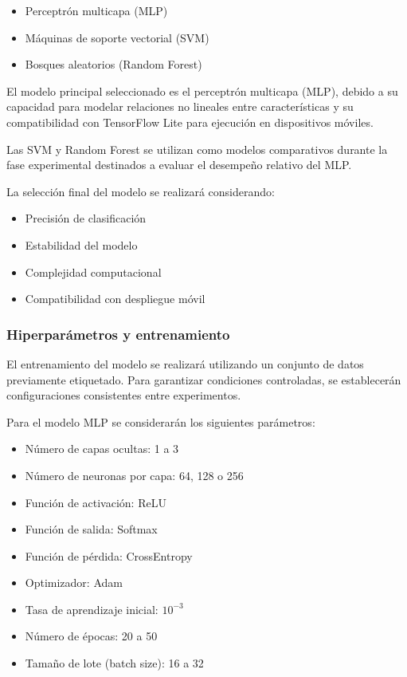 	\begin{itemize}
		\item Perceptrón multicapa (MLP)
		\item Máquinas de soporte vectorial (SVM)
		\item Bosques aleatorios (Random Forest)
	\end{itemize}
	
	El modelo principal seleccionado es el perceptrón multicapa (MLP), debido a su capacidad para modelar relaciones no lineales entre características y su compatibilidad con TensorFlow Lite para ejecución en dispositivos móviles.
	
	Las SVM y Random Forest se utilizan como modelos comparativos durante 
	la fase experimental destinados a evaluar el desempeño relativo del MLP.
	
	La selección final del modelo se realizará considerando:
	\begin{itemize}
		\item Precisión de clasificación
		\item Estabilidad del modelo
		\item Complejidad computacional
		\item Compatibilidad con despliegue móvil
	\end{itemize}
	
	\subsubsection{Hiperparámetros y entrenamiento}
	
	El entrenamiento del modelo se realizará utilizando un conjunto de datos
	previamente etiquetado. Para garantizar condiciones controladas, se establecerán configuraciones consistentes entre experimentos.
	
	Para el modelo MLP se considerarán los siguientes parámetros:
	
	\begin{itemize}
		\item Número de capas ocultas: 1 a 3
		\item Número de neuronas por capa: 64, 128 o 256
		\item Función de activación: ReLU
		\item Función de salida: Softmax
		\item Función de pérdida: CrossEntropy
		\item Optimizador: Adam
		\item Tasa de aprendizaje inicial: $10^{-3}$
		\item Número de épocas: 20 a 50
		\item Tamaño de lote (batch size): 16 a 32
	\end{itemize}
	
